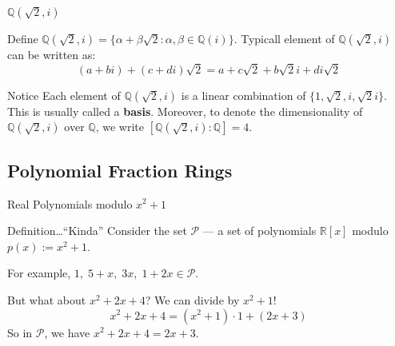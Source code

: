 \documentclass{zkdl-presentation-template}
\begin{document}
    \begin{frame}{$\mathbb{Q}(\sqrt{2}, i)$}
        \begin{example}
            Define $\mathbb{Q}(\sqrt{2}, i) = \{\alpha+\beta\sqrt{2}: \alpha,\beta \in \mathbb{Q}(i)\}$. Typicall element of $\mathbb{Q}(\sqrt{2}, i)$ can be written as:
            \begin{equation*}
                (a+bi) + (c+di)\sqrt{2} = a+c\sqrt{2} + b\sqrt{2}i + di\sqrt{2} 
            \end{equation*}
        \end{example}

        \begin{block}{Notice}
            Each element of $\mathbb{Q}(\sqrt{2}, i)$ is a linear combination of $\{1,\sqrt{2},i,\sqrt{2}i\}$. This is usually called a \textbf{basis}. Moreover, to denote the dimensionality of $\mathbb{Q}(\sqrt{2}, i)$ over $\mathbb{Q}$, we write $[\mathbb{Q}(\sqrt{2}, i):\mathbb{Q}]=4$.
        \end{block}
    \end{frame}

    \subsection{Polynomial Fraction Rings}
    \begin{frame}{Real Polynomials modulo $x^2+1$}
        \begin{block}{Definition\ldots ``Kinda''}
            Consider the set $\mathcal{P}$ --- a set of polynomials $\mathbb{R}[x]$ modulo $p(x) := x^2+1$.
        \end{block}

        \begin{example}
            For example, $1,\;5+x,\;3x,\;1+2x \in \mathcal{P}$. 
            \vspace{7.5px}

            But what about $x^2+2x+4$? We can divide by $x^2+1$!
            \begin{equation*}
                x^2+2x+4 = (x^2+1)\cdot 1 + (2x+3)
            \end{equation*}
            So in $\mathcal{P}$, we have $x^2+2x+4=2x+3$.
        \end{example}
    \end{frame}
\end{document}
